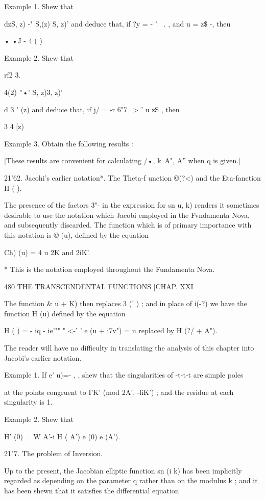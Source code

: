 Example 1. Shew that

dzS, z) -" S,(z) S, z)' and deduce that, if ?y = - " ~. , and u = z\$
-, theu

• •J - 4 ( )

Example 2. Shew that

rf2 3.



4(2) ''•' S, z)3, z)'



d 3 ' (z) and deduce that, if j/ = -r 6"7 \ > ' u zS , then

 3 4 [z)

Example 3. Obtain the following results :

[These results are convenient for calculating /•, k\ A", A'' when q is
given.]

21'62. Jacohi's earlier notation*. The Theta-f unction ©(?<) and the
Eta-fanction H ( ).

The presence of the factors 3"- in the expression for sn u, k) renders
it sometimes desirable to use the notation which Jacobi employed in
the Fvndamenta Nova, and subsequently discarded. The function which is
of primary importance with this notation is © (u), defined by the
equation

Ch) (u) = 4 u%
2K and 2iK'.

* This is the notation employed throughout the Fundamenta Nova.



480 THE TRANSCENDENTAL FUNCTIONS [CHAP. XXI

The function \& u + K) then replaces 3 (' ) ; and in place of i(-?) we
have the function H (u) defined by the equation

H ( ) = - iq - ie'"" " <-' ' e (u + i7v") = u%
replaced by H (?/ + A").

The reader will have no difficulty in translating the analysis of this
chapter into Jacobi's earlier notation.

Example 1. If e' u)=- , , shew that the singularities of -t-t-t are
simple poles

at the points congruent to I'K' (mod 2A', -liK') ; and the residue at
each singularity is 1.

Example 2. Shew that

H' (0) = W A'-i H ( A') e (0) e (A').

21"7. The problem of Inversion.

Up to the present, the Jacobian elliptic function sn (i k) has been
implicitly regarded as depending on the parameter q rather than on the
modulus k ; and it has been shewn that it satisfies the differential
equation

